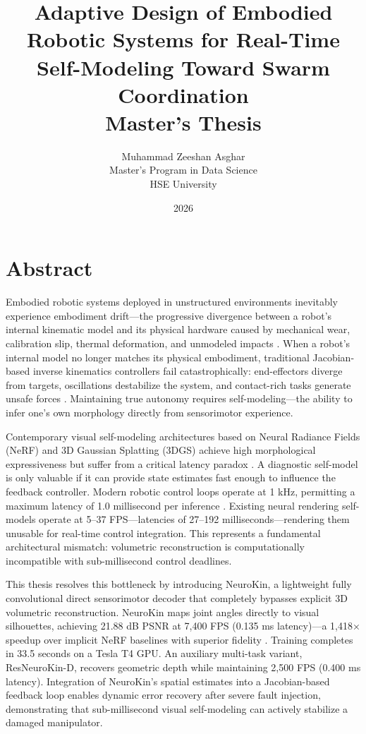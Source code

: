 \documentclass[12pt,a4paper,oneside]{report}
\title{
    \vspace{2cm}
    \textbf{\Large Adaptive Design of Embodied Robotic Systems for Real-Time Self-Modeling Toward Swarm Coordination} \\
    \vspace{1cm}
    \large Master's Thesis
}
\author{
    Muhammad Zeeshan Asghar \\
    Master's Program in Data Science \\
    HSE University
}
\date{\vspace{1cm} 2026}
\begin{document}
\maketitle
\clearpage

\chapter*{Abstract}

Embodied robotic systems deployed in unstructured environments inevitably experience embodiment drift—the progressive divergence between a robot's internal kinematic model and its physical hardware caused by mechanical wear, calibration slip, thermal deformation, and unmodeled impacts \cite{bongard2006resilient, cully2015robots}. When a robot's internal model no longer matches its physical embodiment, traditional Jacobian-based inverse kinematics controllers fail catastrophically: end-effectors diverge from targets, oscillations destabilize the system, and contact-rich tasks generate unsafe forces \cite{kwiatkowski2019task, chen2022full}. Maintaining true autonomy requires self-modeling—the ability to infer one's own morphology directly from sensorimotor experience.

Contemporary visual self-modeling architectures based on Neural Radiance Fields (NeRF) and 3D Gaussian Splatting (3DGS) achieve high morphological expressiveness but suffer from a critical latency paradox \cite{hu2024teaching, hu2025learning}. A diagnostic self-model is only valuable if it can provide state estimates fast enough to influence the feedback controller. Modern robotic control loops operate at 1 kHz, permitting a maximum latency of 1.0 millisecond per inference \cite{siciliano2009robotics}. Existing neural rendering self-models operate at 5–37 FPS—latencies of 27–192 milliseconds—rendering them unusable for real-time control integration. This represents a fundamental architectural mismatch: volumetric reconstruction is computationally incompatible with sub-millisecond control deadlines.

This thesis resolves this bottleneck by introducing NeuroKin, a lightweight fully convolutional direct sensorimotor decoder that completely bypasses explicit 3D volumetric reconstruction. NeuroKin maps joint angles directly to visual silhouettes, achieving 21.88 dB PSNR at 7,400 FPS (0.135 ms latency)—a 1,418× speedup over implicit NeRF baselines with superior fidelity \cite{hu2024teaching}. Training completes in 33.5 seconds on a Tesla T4 GPU. An auxiliary multi-task variant, ResNeuroKin-D, recovers geometric depth while maintaining 2,500 FPS (0.400 ms latency). Integration of NeuroKin's spatial estimates into a Jacobian-based feedback loop enables dynamic error recovery after severe fault injection, demonstrating that sub-millisecond visual self-modeling can actively stabilize a damaged manipulator.
\end{document}
